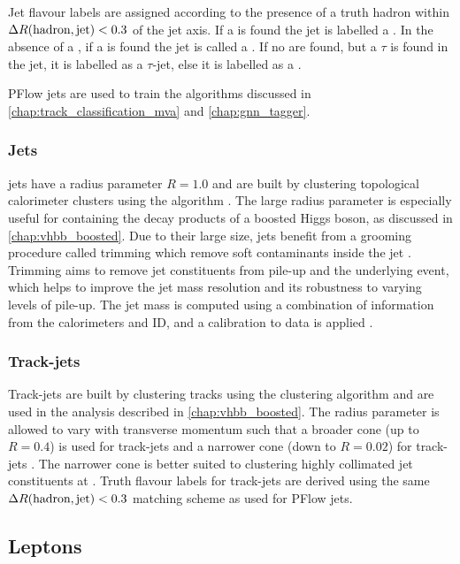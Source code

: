 Jet flavour labels are assigned according to the presence of a truth hadron within ${\Delta R(\text{hadron},\text{jet})<0.3}$ of the jet axis. If a \bhadron is found the jet is labelled a \bjet. In the absence of a \bhadron, if a \chadron is found the jet is called a \cjet.
If no \borchadrons are found, but a $\tau$ is found in the jet, it is labelled as a $\tau$-jet, else it is labelled as a \ljet.

PFlow jets are used to train the algorithms discussed in \cref{chap:track_classification_mva} and \cref{chap:gnn_tagger}.

\subsubsection{\texorpdfstring{\LargeR}{Large-R} Jets}
\LargeR jets have a radius parameter $R=1.0$ and are built by clustering topological calorimeter clusters using the \antikt algorithm \cite{Butterworth:2008iy}.
The large radius parameter is especially useful for containing the decay products of a boosted Higgs boson, as discussed in \cref{chap:vhbb_boosted}. 
Due to their large size, \largeR jets benefit from a grooming procedure called trimming which remove soft contaminants inside the jet \cite{ATLAS:2020jwz,ATLAS:2013bqs}.
Trimming aims to remove jet constituents from pile-up and the underlying event, which helps to improve the jet mass resolution and its robustness to varying levels of pile-up.
The jet mass is computed using a combination of information from the calorimeters and ID, and a calibration to data is applied \cite{JETM-2018-02}.


\subsubsection{Track-jets}
Track-jets are built by clustering tracks using the \antikt clustering algorithm and are used in the analysis described in \cref{chap:vhbb_boosted}.
The radius parameter is allowed to vary with transverse momentum such that a broader cone (up to $R=0.4$) is used for \lowpt track-jets and a narrower cone (down to $R=0.02$) for \highpt track-jets \cite{Krohn:2009zg,ATL-PHYS-PUB-2017-010}.
The narrower cone is better suited to clustering highly collimated jet constituents at \highpt.
Truth flavour labels for track-jets are derived using the same ${\Delta R(\text{hadron},\text{jet})<0.3}$ matching scheme as used for PFlow jets.

\subsection{Leptons}\label{sec:lepton_reco}

